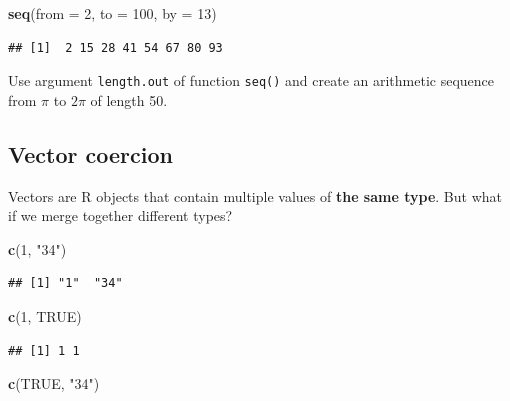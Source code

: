 \documentclass[
]{book}
\makeatletter
\newenvironment{Shaded}{\begin{snugshade}}{\end{snugshade}}
\newcommand{\DataTypeTok}[1]{\textcolor[rgb]{0.13,0.29,0.53}{#1}}
\newcommand{\DecValTok}[1]{\textcolor[rgb]{0.00,0.00,0.81}{#1}}
\newcommand{\KeywordTok}[1]{\textcolor[rgb]{0.13,0.29,0.53}{\textbf{#1}}}
\newcommand{\NormalTok}[1]{#1}
\newcommand{\OtherTok}[1]{\textcolor[rgb]{0.56,0.35,0.01}{#1}}
\newcommand{\StringTok}[1]{\textcolor[rgb]{0.31,0.60,0.02}{#1}}
\newenvironment{kframe}{%
\medskip{}
\setlength{\fboxsep}{.8em}
 \def\at@end@of@kframe{}%
 \ifinner\ifhmode%
  \def\at@end@of@kframe{\end{minipage}}%
  \begin{minipage}{\columnwidth}%
 \fi\fi%
 \def\FrameCommand##1{\hskip\@totalleftmargin \hskip-\fboxsep
 \colorbox{shadecolor}{##1}\hskip-\fboxsep
     \hskip-\linewidth \hskip-\@totalleftmargin \hskip\columnwidth}%
 \MakeFramed {\advance\hsize-\width
   \@totalleftmargin\z@ \linewidth\hsize
   \@setminipage}}%
 {\par\unskip\endMakeFramed%
 \at@end@of@kframe}
\newenvironment{rmdblock}[1]
  {
  \begin{itemize}
  \renewcommand{\labelitemi}{
    \raisebox{-.7\height}[0pt][0pt]{
      {\setkeys{Gin}{width=3em,keepaspectratio}\texttt{[image: images/\#1]}}
    }
  }
  \setlength{\fboxsep}{1em}
  \begin{kframe}
  \item
  }
  {
  \end{kframe}
  \end{itemize}
  }
\newenvironment{rmdtask}
  {\begin{rmdblock}{task}}
  {\end{rmdblock}}
\makeatother
\begin{document}
\begin{Shaded}
\begin{Highlighting}[]
\KeywordTok{seq}\NormalTok{(}\DataTypeTok{from =} \DecValTok{2}\NormalTok{, }\DataTypeTok{to =} \DecValTok{100}\NormalTok{, }\DataTypeTok{by =} \DecValTok{13}\NormalTok{)}
\end{Highlighting}
\end{Shaded}

\begin{verbatim}
## [1]  2 15 28 41 54 67 80 93
\end{verbatim}

\begin{rmdtask}
Use argument \texttt{length.out} of function \texttt{seq()} and create
an arithmetic sequence from \(\pi\) to \(2\pi\) of length 50.
\end{rmdtask}

\hypertarget{vector-coercion}{%
\subsection{Vector coercion}\label{vector-coercion}}

Vectors are R objects that contain multiple values of \textbf{the same type}. But what if we merge together different types?

\begin{Shaded}
\begin{Highlighting}[]
\KeywordTok{c}\NormalTok{(}\DecValTok{1}\NormalTok{, }\StringTok{"34"}\NormalTok{)}
\end{Highlighting}
\end{Shaded}

\begin{verbatim}
## [1] "1"  "34"
\end{verbatim}

\begin{Shaded}
\begin{Highlighting}[]
\KeywordTok{c}\NormalTok{(}\DecValTok{1}\NormalTok{, }\OtherTok{TRUE}\NormalTok{)}
\end{Highlighting}
\end{Shaded}

\begin{verbatim}
## [1] 1 1
\end{verbatim}

\begin{Shaded}
\begin{Highlighting}[]
\KeywordTok{c}\NormalTok{(}\OtherTok{TRUE}\NormalTok{, }\StringTok{"34"}\NormalTok{)}
\end{Highlighting}
\end{Shaded}
\end{document}
